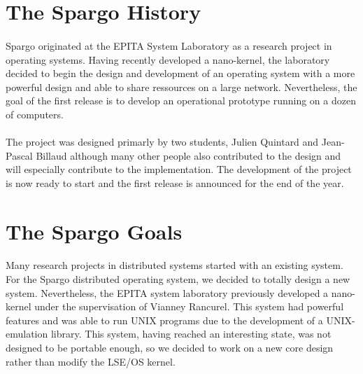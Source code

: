 \documentclass[10pt,a4wide]{article}
\begin{document}
\begin{multicols}{2}



\section{The Spargo History}

\paragraph{}

Spargo originated at the EPITA System Laboratory as a research project
in operating systems. Having recently developed a nano-kernel, the laboratory
decided to begin the design and development of an operating system with
a more powerful design and able to share ressources on a large network.
Nevertheless, the goal of the first release is to develop an operational
prototype running on a dozen of computers.

\paragraph{}

The project was designed primarly by two students, Julien Quintard and
Jean-Pascal Billaud although many other people also contributed to the
design and will especially contribute to the implementation.
The development of the project is now ready to start and the first release
is announced for the end of the year.



\section{The Spargo Goals}

\paragraph{}

Many research projects in distributed systems started with an existing system.
For the Spargo distributed operating system, we decided to totally design a
new system. Nevertheless, the EPITA system laboratory previously developed a
nano-kernel under the supervisation of Vianney Rancurel. This system had
powerful features and was able to run UNIX programs due to the development of
a UNIX-emulation library. This system, having reached an interesting state,
was not designed to be portable enough, so we decided to work on a new
core design rather than modify the LSE/OS kernel.


\end{multicols}
\end{document}
